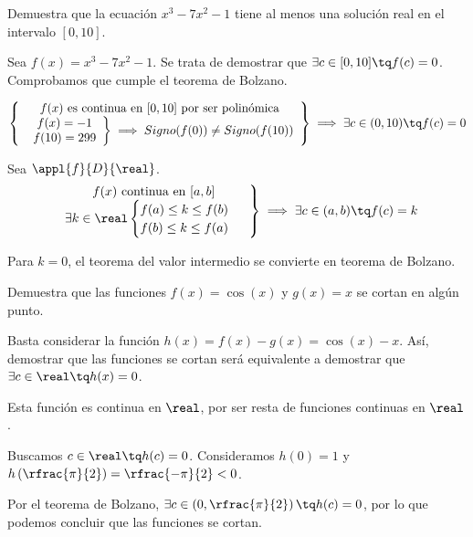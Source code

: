 \begin{problem} Demuestra que la ecuación $x^3-7x^2-1$ tiene al menos una solución real en el intervalo $[0,10]$.
\solution

Sea $f(x) = x^3-7x^2-1$. Se trata de demostrar que $\exists c\in[0,10]\tq f(c) = 0$. Comprobamos que cumple el teorema de Bolzano.

\[
\left\{
	\begin{array}{c}
		f(x) \text{ es continua en } [0,10] \text{ por ser polinómica}\\
		\left.\begin{array}{c}
		f(x) = -1 \\
		f(10) = 299\end{array}
		\right\}\implies Signo(f(0))\neq Signo(f(10))
	\end{array}
\right\}\implies \exists c\in(0,10)\tq f(c)=0 
\]
\end{problem}

\begin{theorem}
Sea $\appl{f}{D}{\real}$.
\[
\left.\begin{array}{c}f(x) \text{ continua en } [a,b]\\
\exists k\in\real \begin{cases}f(a)\leq k\leq f(b)\\f(b)\leq k \leq f(a)\end{cases}\end{array}\right\}\implies \exists c\in(a,b) \tq f(c) = k
\]
\end{theorem}

\obs Para $k=0$, el teorema del valor intermedio se convierte en teorema de Bolzano.


\begin{problem}
Demuestra que las funciones $f(x) = \cos(x)$ y $g(x) = x$ se cortan en algún punto.
\solution

Basta considerar la función $h(x) = f(x) - g(x) = \cos(x)-x$. Así, demostrar que las funciones se cortan será equivalente a demostrar que $\exists c\in\real\tq h(x)=0$. 

Esta función es continua en $\real$, por ser resta de funciones continuas en $\real$.

Buscamos $c\in\real\tq h(c)=0$. Consideramos $h(0) = 1$ y $h\left(\rfrac{\pi}{2}\right) = \rfrac{-\pi}{2}<0$.

Por el teorema de Bolzano, $\exists c\in\left(0,\rfrac{\pi}{2}\right)\tq h(c) = 0$, por lo que podemos concluir que las funciones se cortan.
\end{problem}

